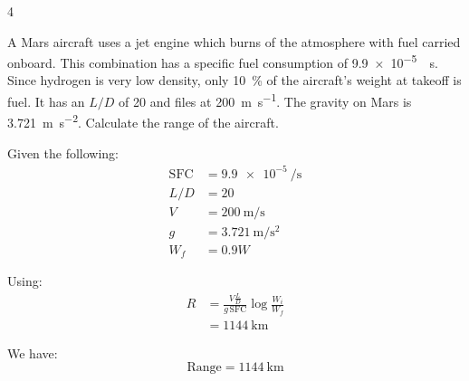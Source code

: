 \begin{hwkProblem*}{4}{} \label{hwk:p04}

	A Mars aircraft uses a jet engine which burns  of the atmosphere with  fuel carried onboard. This combination has a specific fuel consumption of \qty{9.9e-5}{\per\s}. Since hydrogen is very low density, only \qty{10}{\percent} of the aircraft's weight at takeoff is fuel. It has an \( L/D \) of 20 and files at \qty{200}{\m\per\s}. The gravity on Mars is \qty{3.721}{\m\per\s\squared}. Calculate the range of the aircraft.

	\hwkSol{} \label{hwk:s04}

	Given the following:
	\begin{align*}
		\text{SFC} &= \qty{9.9e-5}{\per\s} \\
		L/D &= 20 \\
		V &= \qty{200}{\m\per\s} \\
		g &= \qty{3.721}{\m\per\s\squared} \\
		W_{f} &= 0.9 W
	\end{align*}

	Using:
	\begin{align*}
		R &= \frac{V \frac{L}{D}}{g \, \text{SFC}} \log{\frac{W_{i}}{W_{f}}} \\
		\, &= \qty{1144}{\km}
	\end{align*}

	We have:
	\[
		\boxed{\text{Range} = \qty{1144}{\km}}
	\]

\end{hwkProblem*}

%
%
%
%
%
%
%
%
%
%
%
%
%
%
%


